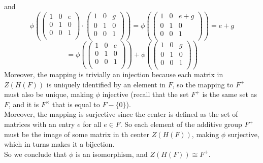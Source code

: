 \documentclass[12pt]{article}
\begin{document}
    and
    \[ \phi \left( \begin{pmatrix}
        1 & 0 & e \\        
        0 & 1 & 0 \\
        0 & 0 & 1 \\
    \end{pmatrix} \cdot \begin{pmatrix}
        1 & 0 & g \\        
        0 & 1 & 0 \\
        0 & 0 & 1 \\
    \end{pmatrix} \right)
    = \phi \left(\begin{pmatrix}
        1 & 0 & e + g \\        
        0 & 1 & 0 \\
        0 & 0 & 1 \\
    \end{pmatrix} \right)
    = e + g \]
    \[ = \phi \left(\begin{pmatrix}
        1 & 0 & e \\        
        0 & 1 & 0 \\
        0 & 0 & 1 \\
    \end{pmatrix} \right)
    + \phi \left(\begin{pmatrix}
        1 & 0 & g \\        
        0 & 1 & 0 \\
        0 & 0 & 1 \\
    \end{pmatrix} \right) \]
    Moreover, the mapping is trivially an injection
    because each matrix in $Z(H(F))$ is uniquely
    identified by an element in $F$,
    so the mapping to $F^+$ must also be unique,
    making $\phi$ injective
    (recall that the set $F^+$ is the same set as $F$,
    and it is $F^\times$ that is equal to $F - \{0\}$). \\
    Moreover, the mapping is surjective since 
    the center is defined as the set of matrices with an entry
    $e$ for all $e \in F$.
    So each element of the additive group $F^+$ must be the image
    of some matrix in th center $Z(H(F))$,
    making $\phi$ surjective,
    which in turns makes it a bijection. \\
    So we conclude that $\phi$ is an isomorphism,
    and $Z(H(F)) \cong F^+$.
\end{document}
